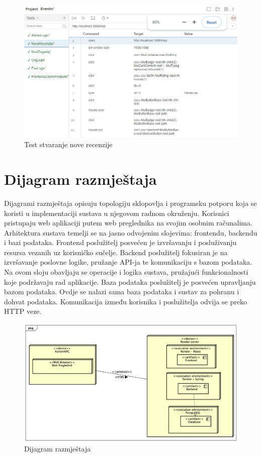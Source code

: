 			\begin{figure}[H]
				\includegraphics[scale=0.45]{testovi/selRecenzija.jpeg}
				\centering
				\caption{Test stvaranje nove recenzije}
				\label{fig:promjene}
			\end{figure}
			
		
		
		\section{Dijagram razmještaja}
			
			Dijagrami razmještaja opisuju topologiju sklopovlja i programsku potporu koja se koristi u implementaciji sustava u njegovom radnom okruženju. Korisnici pristupaju web aplikaciji putem web preglednika na svojim osobnim računalima. Arhitektura sustava temelji se na jasno odvojenim slojevima: frontendu, backendu i bazi podataka. 
			Frontend poslužitelj posvećen je izvršavanju i posluživanju resursa vezanih uz korisničko sučelje. Backend poslužitelj fokusiran  je na izvršavanje poslovne logike, pružanje API-ja te komunikaciju s bazom podataka. Na ovom sloju obavljaju se operacije i logika sustava, pružajući funkcionalnosti koje podržavaju rad aplikacije. Baza podataka poslužitelj je posvećen upravljanju bazom podataka. Ovdje se nalazi sama baza podataka i sustav za pohranu i dohvat podataka.  Komunikacija između korisnika i poslužitelja odvija se preko HTTP veze.
			 
			 \begin{figure}[H]
			 	\includegraphics[scale=0.45]{dijagrami/dijagramRazmjestaja.png}
			 	\centering
			 	\caption{Dijagram razmještaja}
			 	\label{fig:promjene}
			 \end{figure}
			
